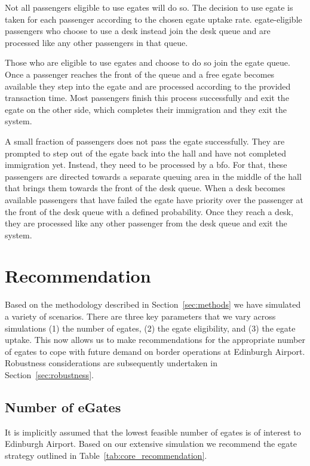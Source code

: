 \documentclass[10pt]{article}
\begin{document}
Not all passengers eligible to use \glspl{egate} will do so. The decision to use \gls{egate} is taken for each passenger according to the chosen \gls{egate} uptake rate. \gls{egate}-eligible passengers who choose to use a desk instead join the desk queue and are processed like any other passengers in that queue. 

Those who are eligible to use \glspl{egate} and choose to do so join the \gls{egate} queue. Once a passenger reaches the front of the queue and a free \gls{egate} becomes available they step into the \gls{egate} and are processed according to the provided transaction time. Most passengers finish this process successfully and exit the \gls{egate} on the other side, which completes their immigration and they exit the system.

A small fraction of passengers does not pass the \gls{egate} successfully. They are prompted to step out of the \gls{egate} back into the hall and have not completed immigration yet. Instead, they need to be processed by a \gls{bfo}. For that, these passengers are directed towards a separate queuing area in the middle of the hall that brings them towards the front of the desk queue. When a desk becomes available passengers that have failed the \gls{egate} have priority over the passenger at the front of the desk queue with a defined probability. Once they reach a desk, they are processed like any other passenger from the desk queue and exit the system.



\section{Recommendation}

Based on the methodology described in Section~\ref{sec:methods} we have simulated a variety of scenarios. There are three key parameters that we vary across simulations (1) the number of \glspl{egate}, (2) the \gls{egate} eligibility, and (3) the \gls{egate} uptake. This now allows us to make recommendations for the appropriate number of \glspl{egate} to cope with future demand on border operations at Edinburgh Airport. Robustness considerations are subsequently undertaken in Section~\ref{sec:robustness}. 

\subsection{Number of eGates}

It is implicitly assumed that the lowest feasible number of \glspl{egate} is of interest to Edinburgh Airport. Based on our extensive simulation we recommend the \gls{egate} strategy outlined in Table~\ref{tab:core_recommendation}. 
\end{document}
